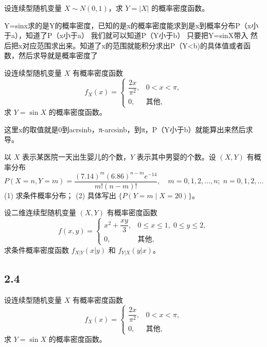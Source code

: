 \begin{homework}[2.34]
设连续型随机变量 $X \sim N(0,1)$，求 $Y = |X|$ 的概率密度函数。
\end{homework}
\begin{dxtips}
    Y=sinx求的是Y的概率密度，已知的是x的概率密度能求到是x到概率分布P（x小于a），知道了P（x小于a）
    我们就可以知道P（Y小于b）
    只要把Y=sinX带入
    然后把x对应范围求出来。知道了x的范围就能积分求出P（Y<b)的具体值或者函数，然后求导就是概率密度了
\end{dxtips}
\begin{homework}[2.35]
设连续型随机变量 $X$ 有概率密度函数
\[
f_X(x) =
\begin{cases}
\dfrac{2x}{\pi^2}, & 0 < x < \pi, \\[6pt]
0, & \text{其他},
\end{cases}
\]
求 $Y = \sin X$ 的概率密度函数。
\end{homework}
\begin{dxtips}
    这里x的取值就是0到acrsinb，π-arcsinb，到π，P（Y小于b）就能算出来然后求导。
\end{dxtips}
\begin{homework}[2.37]
以 $X$ 表示某医院一天出生婴儿的个数，$Y$ 表示其中男婴的个数。设 $(X,Y)$ 有概率分布
\[
P(X = n, Y = m) = \frac{(7.14)^m (6.86)^{n-m} e^{-14}}{m!(n-m)!}, 
\quad m = 0,1,2,\ldots,n; \; n = 0,1,2,\ldots
\]
(1) 求条件概率分布；  
(2) 具体写出 $\{ P(Y = m \mid X = 20) \}$。
\end{homework}

\begin{homework}[2.39]
设二维连续型随机变量 $(X,Y)$ 有概率密度函数
\[
f(x,y) =
\begin{cases}
x^2 + \dfrac{xy}{3}, & 0 \leq x \leq 1, \; 0 \leq y \leq 2, \\[6pt]
0, & \text{其他},
\end{cases}
\]
求条件概率密度函数 $f_{X|Y}(x|y)$ 和 $f_{Y|X}(y|x)$。
\end{homework}
\subsection{2.4}
\begin{homework}[2.42]
设连续型随机变量 $X$ 有概率密度函数
\[
f_X(x) =
\begin{cases}
\dfrac{2x}{\pi^2}, & 0 < x < \pi,\\[6pt]
0, & \text{其他},
\end{cases}
\]
求 $Y = \sin X$ 的概率密度函数。
\end{homework}

